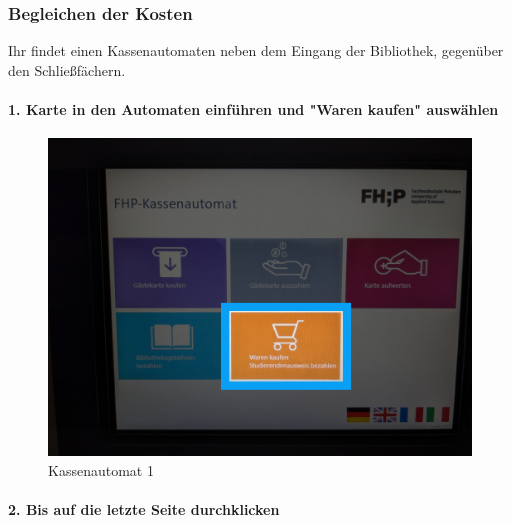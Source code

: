 \documentclass[]{article}
\let\oldparagraph\paragraph
\renewcommand{\paragraph}[1]{\oldparagraph{#1}\mbox{}}
\begin{document}
\hypertarget{begleichen-der-kosten}{%
\subsubsection{Begleichen der Kosten}\label{begleichen-der-kosten}}

Ihr findet einen Kassenautomaten neben dem Eingang der Bibliothek,
gegenüber den Schließfächern.

\hypertarget{karte-in-den-automaten-einfuxfchren-und-waren-kaufen-auswuxe4hlen}{%
\paragraph{1. Karte in den Automaten einführen und "Waren kaufen"
auswählen}\label{karte-in-den-automaten-einfuxfchren-und-waren-kaufen-auswuxe4hlen}}

\begin{figure}
\hypertarget{fig:payment-1}{%
\centering
\includegraphics{assets/images/payment-1.png}
\caption{Kassenautomat 1}\label{fig:payment-1}
}
\end{figure}

\hypertarget{bis-auf-die-letzte-seite-durchklicken}{%
\paragraph{2. Bis auf die letzte Seite
durchklicken}\label{bis-auf-die-letzte-seite-durchklicken}}
\end{document}
